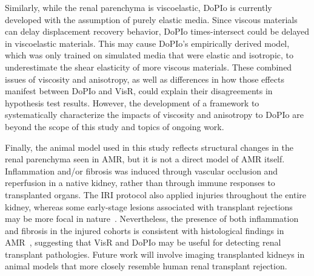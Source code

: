 Similarly, while the renal parenchyma is viscoelastic, DoPIo is currently developed with the assumption of purely elastic media. Since viscous materials can delay displacement recovery behavior, DoPIo times-intersect could be delayed in viscoelastic materials. This may cause DoPIo's empirically derived model, which was only trained on simulated media that were elastic and isotropic, to underestimate the shear elasticity of more viscous materials.  These combined issues of viscosity and anisotropy, as well as differences in how those effects manifest between DoPIo and VisR, could explain their disagreements in hypothesis test results. However, the development of a framework to systematically characterize the impacts of viscosity and anisotropy to DoPIo are beyond the scope of this study and topics of ongoing work.

Finally, the animal model used in this study reflects structural changes in the renal parenchyma seen in AMR, but it is not a direct model of AMR itself. Inflammation and/or fibrosis was induced through vascular occlusion and reperfusion in a native kidney, rather than through immune responses to transplanted organs. The IRI protocol also applied injuries throughout the entire kidney, whereas some early-stage lesions associated with transplant rejections may be more focal in nature~\cite{saritas_Kidney_2021,loupy_Banff_2020}. Nevertheless, the presence of both inflammation and fibrosis in the injured cohorts is consistent with histological findings in AMR~\cite{loupy_Banff_2020,venner_Relationships_2016}, suggesting that VisR and DoPIo may be useful for detecting renal transplant pathologies. Future work will involve imaging transplanted kidneys in animal models that more closely resemble human renal transplant rejection.
